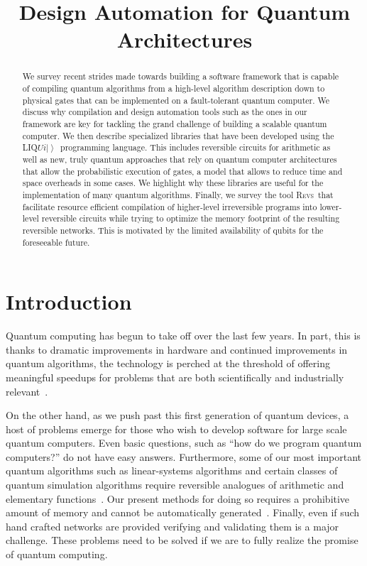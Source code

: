 \documentclass[conference]{IEEEtran}
\title{Design Automation for Quantum Architectures}
\author{%
  \IEEEauthorblockN{Martin Roetteler \qquad Krysta M. Svore \qquad Nathan Wiebe}
  \IEEEauthorblockA{%
Microsoft Research, Redmond, WA, USA
  }
}
\newcommand{\ket}[1]{\left| #1\right\rangle}        %
\newcommand{\Liquid}{LIQ$Ui\ket{}$\ }
\newcommand{\REVS}{{\textsc{Revs}}}
\begin{document}
\maketitle

\begin{abstract}
We survey recent strides made towards building a software framework that is capable of compiling quantum algorithms from a high-level algorithm description down to physical gates that can be implemented on a fault-tolerant quantum computer. We discuss why compilation and design automation tools such as the ones in our framework are key for tackling the grand challenge of building a scalable quantum computer. We then describe specialized libraries that have been developed using the \Liquid programming language. This includes reversible circuits for arithmetic as well as new, truly quantum approaches that rely on quantum computer architectures that allow the probabilistic execution of gates, a model that allows to reduce time and space overheads in some cases. We highlight why these libraries are useful for the implementation of many quantum algorithms. Finally, we survey the tool \REVS~that facilitate resource efficient compilation of higher-level irreversible programs into lower-level reversible circuits while trying to optimize the memory footprint of the resulting reversible networks. This is motivated by the limited availability of qubits for the foreseeable future. 
\end{abstract}

\section{Introduction}
Quantum computing has begun to take off over the last few years. In part, this is thanks to dramatic improvements in hardware and continued improvements in quantum algorithms, the technology
is perched at the threshold of offering meaningful speedups for problems that are both scientifically and industrially relevant~\cite{barends2014superconducting,cross2015quantum,o2016scalable,benedetti2016estimation}.  

On the other hand, as we push past this first generation of quantum devices, a host of problems emerge for those who wish to develop software for large scale quantum computers.  Even basic questions, such as ``how do we program quantum computers?'' do not have easy answers.  Furthermore, some of our most important quantum algorithms such as linear-systems algorithms and certain classes of quantum simulation algorithms require reversible analogues of arithmetic and elementary functions~\cite{harrow2009quantum,babbush2015exponentially,kivlichan2016bounding}. Our present methods for doing so requires a prohibitive amount of memory and cannot be automatically generated~\cite{BHP+15}.  Finally, even if such hand crafted networks are provided verifying and validating them is a major challenge.  These problems need to be solved if we are to fully realize the promise of quantum computing.
\end{document}
